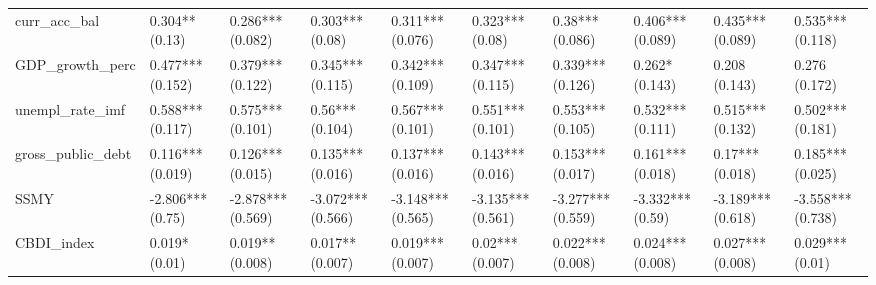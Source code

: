 \begin{table}[H]
\begin{subtable}[c]{\textwidth}
{\begin{tabular}{llllllllll}
  curr\_acc\_bal & 0.304** (0.13) & 0.286*** (0.082) & 0.303*** (0.08) & 0.311*** (0.076) & 0.323*** (0.08) & 0.38*** (0.086) & 0.406*** (0.089) & 0.435*** (0.089) & 0.535*** (0.118) \\ 
  GDP\_growth\_perc & 0.477*** (0.152) & 0.379*** (0.122) & 0.345*** (0.115) & 0.342*** (0.109) & 0.347*** (0.115) & 0.339*** (0.126) & 0.262* (0.143) & 0.208 (0.143) & 0.276 (0.172) \\ 
  unempl\_rate\_imf & 0.588*** (0.117) & 0.575*** (0.101) & 0.56*** (0.104) & 0.567*** (0.101) & 0.551*** (0.101) & 0.553*** (0.105) & 0.532*** (0.111) & 0.515*** (0.132) & 0.502*** (0.181) \\ 
  gross\_public\_debt & 0.116*** (0.019) & 0.126*** (0.015) & 0.135*** (0.016) & 0.137*** (0.016) & 0.143*** (0.016) & 0.153*** (0.017) & 0.161*** (0.018) & 0.17*** (0.018) & 0.185*** (0.025) \\ 
  SSMY & -2.806*** (0.75) & -2.878*** (0.569) & -3.072*** (0.566) & -3.148*** (0.565) & -3.135*** (0.561) & -3.277*** (0.559) & -3.332*** (0.59) & -3.189*** (0.618) & -3.558*** (0.738) \\ 
  CBDI\_index & 0.019* (0.01) & 0.019** (0.008) & 0.017** (0.007) & 0.019*** (0.007) & 0.02*** (0.007) & 0.022*** (0.008) & 0.024*** (0.008) & 0.027*** (0.008) & 0.029*** (0.01) \\ 
   \bottomrule
\end{tabular}}



\end{subtable}
\end{table}
